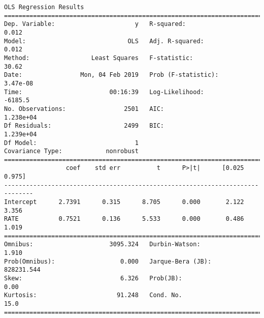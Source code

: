 \documentclass[11pt]{article}
\begin{document}
    \begin{Verbatim}[commandchars=\\\{\}]
                            OLS Regression Results                            
==============================================================================
Dep. Variable:                      y   R-squared:                       0.012
Model:                            OLS   Adj. R-squared:                  0.012
Method:                 Least Squares   F-statistic:                     30.62
Date:                Mon, 04 Feb 2019   Prob (F-statistic):           3.47e-08
Time:                        00:16:39   Log-Likelihood:                -6185.5
No. Observations:                2501   AIC:                         1.238e+04
Df Residuals:                    2499   BIC:                         1.239e+04
Df Model:                           1                                         
Covariance Type:            nonrobust                                         
==============================================================================
                 coef    std err          t      P>|t|      [0.025      0.975]
------------------------------------------------------------------------------
Intercept      2.7391      0.315      8.705      0.000       2.122       3.356
RATE           0.7521      0.136      5.533      0.000       0.486       1.019
==============================================================================
Omnibus:                     3095.324   Durbin-Watson:                   1.910
Prob(Omnibus):                  0.000   Jarque-Bera (JB):           828231.544
Skew:                           6.326   Prob(JB):                         0.00
Kurtosis:                      91.248   Cond. No.                         15.0
==============================================================================


\end{Verbatim}
\end{document}
